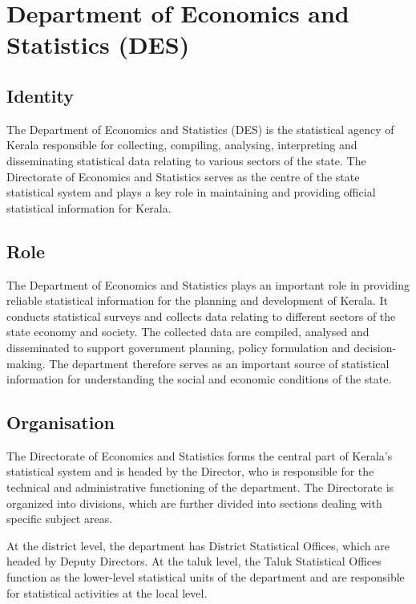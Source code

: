\documentclass[12pt,a4paper]{article}
\begin{document}
\section{Department of Economics and Statistics (DES)}

\subsection{Identity}

The Department of Economics and Statistics (DES) is the statistical agency of Kerala responsible for collecting, compiling, analysing, interpreting and disseminating statistical data relating to various sectors of the state. The Directorate of Economics and Statistics serves as the centre of the state statistical system and plays a key role in maintaining and providing official statistical information for Kerala.

\subsection{Role}

The Department of Economics and Statistics plays an important role in providing reliable statistical information for the planning and development of Kerala. It conducts statistical surveys and collects data relating to different sectors of the state economy and society. The collected data are compiled, analysed and disseminated to support government planning, policy formulation and decision-making. The department therefore serves as an important source of statistical information for understanding the social and economic conditions of the state.

\subsection{Organisation}

The Directorate of Economics and Statistics forms the central part of Kerala's statistical system and is headed by the Director, who is responsible for the technical and administrative functioning of the department. The Directorate is organized into divisions, which are further divided into sections dealing with specific subject areas.

\vspace{0.15cm}

At the district level, the department has District Statistical Offices, which are headed by Deputy Directors. At the taluk level, the Taluk Statistical Offices function as the lower-level statistical units of the department and are responsible for statistical activities at the local level.
\end{document}
